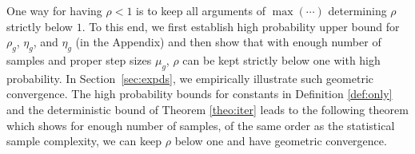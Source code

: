 

One way for having $\rho < 1$ is to keep all arguments of $\max(\cdots)$  determining $\rho$ strictly below $1$. %
To this end, we first establish high probability upper bound for $\rho_g$, $\eta_g$, and $\eta_g$ (in the Appendix) and then show that with enough number of samples and proper step sizes $\mu_g$, $\rho$ can be kept strictly below one with high probability. In Section~\ref{sec:expds}, we empirically illustrate such geometric convergence.
The high probability bounds for constants in Definition \ref{def:only} and the deterministic bound of Theorem \ref{theo:iter} leads to the following theorem which shows for enough number of samples, of the same order as the statistical sample complexity, we can keep $\rho$ below one and have geometric convergence.





